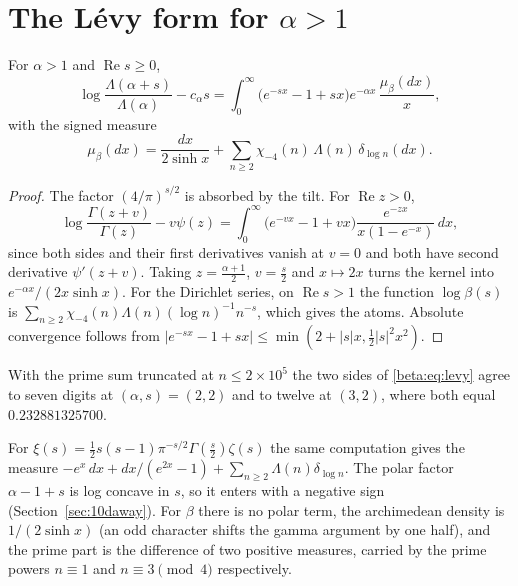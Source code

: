 \section{The L\'evy form for \texorpdfstring{$\alpha>1$}{alpha > 1}}\label{beta:sec:levy}

\begin{theorem}\label{beta:thm:levy}
For $\alpha>1$ and $\operatorname{Re} s\ge0$,
\begin{equation}\label{beta:eq:levy}
\log\frac{\Lambda(\alpha+s)}{\Lambda(\alpha)}-c_\alpha s=\int_0^\infty\bigl(e^{-sx}-1+sx\bigr)e^{-\alpha x}\,\frac{\mu_\beta(dx)}{x},
\end{equation}
with the signed measure
\begin{equation}\label{beta:eq:mubeta}
\mu_\beta(dx)=\frac{dx}{2\sinh x}+\sum_{n\ge2}\chi_{-4}(n)\,\Lambda(n)\,\delta_{\log n}(dx).
\end{equation}
\end{theorem}

\begin{proof}
The factor $(4/\pi)^{s/2}$ is absorbed by the tilt. For $\operatorname{Re} z>0$,
\[
\log\frac{\Gamma(z+v)}{\Gamma(z)}-v\psi(z)=\int_0^\infty\bigl(e^{-vx}-1+vx\bigr)\frac{e^{-zx}}{x(1-e^{-x})}\,dx,
\]
since both sides and their first derivatives vanish at $v=0$ and both have second derivative $\psi'(z+v)$. Taking $z=\tfrac{\alpha+1}{2}$, $v=\tfrac s2$ and $x\mapsto2x$ turns the kernel into $e^{-\alpha x}/(2x\sinh x)$. For the Dirichlet series, on $\operatorname{Re} s>1$ the function $\log\beta(s)$ is $\sum_{n\ge2}\chi_{-4}(n)\Lambda(n)(\log n)^{-1}n^{-s}$, which gives the atoms. Absolute convergence follows from $|e^{-sx}-1+sx|\le\min(2+|s|x,\tfrac12|s|^2x^2)$.
\end{proof}

With the prime sum truncated at $n\le2\times10^5$ the two sides of \eqref{beta:eq:levy} agree to seven digits at $(\alpha,s)=(2,2)$ and to twelve at $(3,2)$, where both equal $0.232881325700$.

\begin{remark}\label{beta:rem:xi}
For $\xi(s)=\tfrac12s(s-1)\pi^{-s/2}\Gamma(\tfrac s2)\zeta(s)$ the same computation gives the measure $-e^x\,dx+dx/(e^{2x}-1)+\sum_{n\ge2}\Lambda(n)\delta_{\log n}$. The polar factor $\alpha-1+s$ is log concave in $s$, so it enters with a negative sign (Section~\ref{sec:10daway}). For $\beta$ there is no polar term, the archimedean density is $1/(2\sinh x)$ (an odd character shifts the gamma argument by one half), and the prime part is the difference of two positive measures, carried by the prime powers $n\equiv1$ and $n\equiv3\pmod4$ respectively.
\end{remark}


